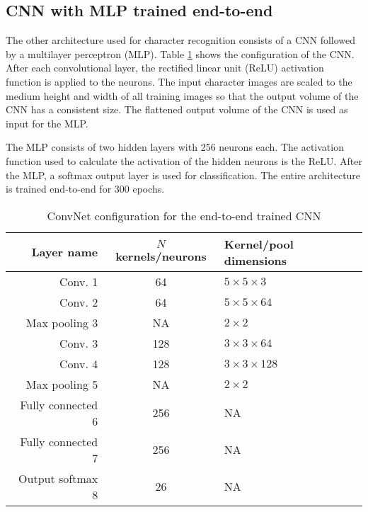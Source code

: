 \subsection{CNN with MLP trained end-to-end}
\label{sec:hmdcnn}

The other architecture used for character recognition consists of a CNN followed by a multilayer perceptron (MLP). Table \ref{tab:hmdcnnconf} shows the configuration of the CNN. After each convolutional layer, the rectified linear unit (ReLU) activation function is applied to the neurons. The input character images are scaled to the medium height and width of all training images so that the output volume of the CNN has a consistent size. The flattened output volume of the CNN is used as input for the MLP. 

The MLP consists of two hidden layers with 256 neurons each. The activation function used to calculate the activation of the hidden neurons is the ReLU. After the MLP, a softmax output layer is used for classification. The entire architecture is trained end-to-end for 300 epochs. 

\begin{table}
\renewcommand{\arraystretch}{1.3}
\centering
\caption{ConvNet configuration for the end-to-end trained CNN}
\begin{tabular}{r|cl}\hline
Layer name & $N$ kernels/neurons & Kernel/pool dimensions \\ \hline \hline
Conv. 1 & 64 & $5 \times 5 \times 3$  \\
Conv. 2 & 64 & $5 \times 5 \times 64$ \\
Max pooling 3 & NA & $2\times 2$ \\
Conv. 3 & 128 & $3 \times 3 \times 64$ \\
Conv. 4 & 128 & $3 \times 3 \times 128$ \\
Max pooling 5 & NA & $2\times 2$ \\ 
Fully connected 6 & 256 & NA \\
Fully connected 7 & 256 & NA \\
Output softmax 8 & 26 & NA \\ \hline
\end{tabular}
\label{tab:hmdcnnconf}
\end{table}
